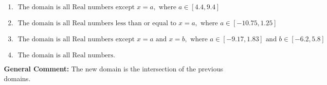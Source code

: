 \documentclass{extbook}[14pt]
\begin{document}
\begin{enumerate}
{\begin{enumerate}[label=\Alph*.]
\item \( \text{ The domain is all Real numbers except } x = a, \text{ where } a \in [4.4, 9.4] \)


\item \( \text{ The domain is all Real numbers less than or equal to } x = a, \text{ where } a \in [-10.75, 1.25] \)


\item \( \text{ The domain is all Real numbers except } x = a \text{ and } x = b, \text{ where } a \in [-9.17, 1.83] \text{ and } b \in [-6.2, 5.8] \)


\item \( \text{ The domain is all Real numbers. } \)


\end{enumerate}

\textbf{General Comment:} The new domain is the intersection of the previous domains.
}
\end{enumerate}
\end{document}
